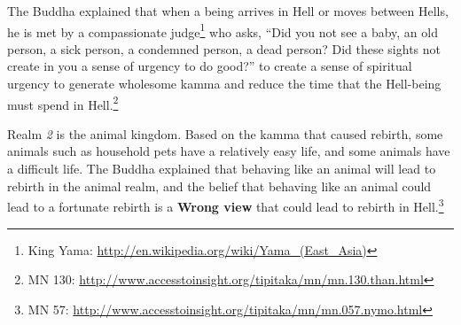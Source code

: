 The Buddha explained that when a being arrives in Hell or moves between Hells, he is met by a compassionate judge\footnote{King Yama: \url{http://en.wikipedia.org/wiki/Yama_(East_Asia)}} who asks, “Did you not see a baby, an old person, a sick person, a condemned person, a dead person? Did these sights not create in you a sense of urgency to do good?” to create a sense of spiritual urgency to generate wholesome kamma and reduce the time that the Hell-being must spend in Hell.\footnote{MN 130: \url{http://www.accesstoinsight.org/tipitaka/mn/mn.130.than.html}}

\pagebreak

Realm \textit{2} is the animal kingdom. Based on the kamma that caused rebirth, some animals such as household pets have a relatively easy life, and some animals have a difficult life. The Buddha explained that behaving like an animal will lead to rebirth in the animal realm, and the belief that behaving like an animal could lead to a fortunate rebirth is a \textbf{Wrong view} that could lead to rebirth in Hell.\footnote{MN 57: \url{http://www.accesstoinsight.org/tipitaka/mn/mn.057.nymo.html}}

